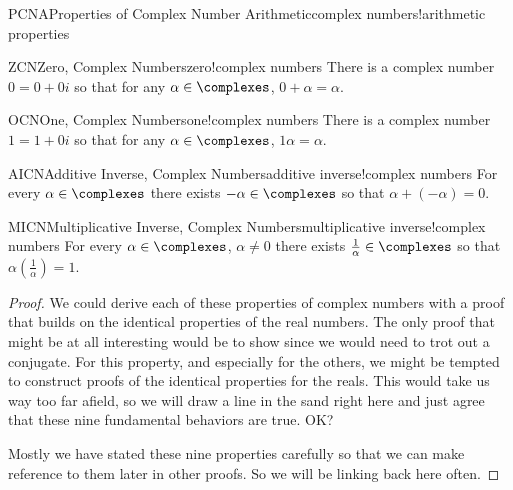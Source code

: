 \begin{theorem}{PCNA}{Properties of Complex Number Arithmetic}{complex numbers!arithmetic properties}
\begin{propertylist}
%
\begin{property}{ZCN}{Zero, Complex Numbers}{zero!complex numbers}
There is a complex number $0=0+0i$ so that for any $\alpha\in\complexes$, $0+\alpha=\alpha$.\end{property}
%
\begin{property}{OCN}{One, Complex Numbers}{one!complex numbers}
There is a complex number $1=1+0i$ so that for any $\alpha\in\complexes$, $1\alpha=\alpha$.\end{property}
%
\begin{property}{AICN}{Additive Inverse, Complex Numbers}{additive inverse!complex numbers}
For every $\alpha\in\complexes$ there exists $-\alpha\in\complexes$ so that $\alpha+\left(-\alpha\right)=0$.\end{property}
%
\begin{property}{MICN}{Multiplicative Inverse, Complex Numbers}{multiplicative inverse!complex numbers}
For every $\alpha\in\complexes$, $\alpha\neq 0$ there exists $\frac{1}{\alpha}\in\complexes$ so that $\alpha\left(\frac{1}{\alpha}\right)=1$.\end{property}
%
\end{propertylist}
\end{theorem}
%
\begin{proof}
We could derive each of these properties of complex numbers with a proof that builds on the identical properties of the real numbers.  The only proof that might be at all interesting would be to show  since we would need to trot out a conjugate.  For this property, and especially for the others, we might be tempted to construct proofs of the identical properties for the reals.  This would take us way too far afield, so we will draw a line in the sand right here and just agree that these nine fundamental behaviors are true.  OK?\par
%
Mostly we have stated these nine properties carefully so that we can make reference to them later in other proofs.  So we will be linking back here often.
%
\end{proof}







